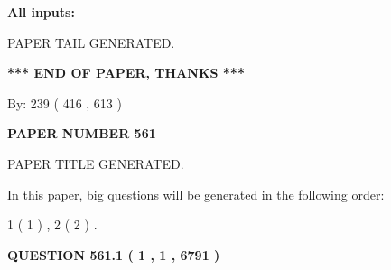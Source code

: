 \documentclass{ctexart}
\begin{document}
   
   
   
\noindent{}
   
   
   
   
\noindent\vspace{0.1in}\hspace{-0.08in} {\textbf{\Large{All inputs: }}}
   
   
   
   
   
   
 \vspace{0.2in}
 
   
   
\vspace{2.0in} PAPER TAIL GENERATED.
   
   
   
   
\vspace{1.0in} 
{\textbf{\large{ *** END OF PAPER, THANKS *** }}} 
   
   
\hspace{1.0in} By: 
 239 ( 416 ,  613 )
   
   
   
   
\newpage 
\setcounter{page}{ 
   561001 } 
   
   
   
   
 {\textbf{ \Large{ PAPER NUMBER  561  }}}
   
   
\vspace{0.2in}
   
   
   
   
   
   
   
   
 \vspace{0.2in}
 
 
 
 
   
   
 PAPER TITLE GENERATED.
   
   
   
\vspace{0.2in}
   
In this paper, big questions will be generated in the following order: 
   
   
   1 ( 1 )
 ,
   2 ( 2 )
 .
  
\vspace{0.2in}
  
{\textbf{\Large{QUESTION
561.1 
 ( 1 , 1 , 6791 )
}}}
  
\end{document}
